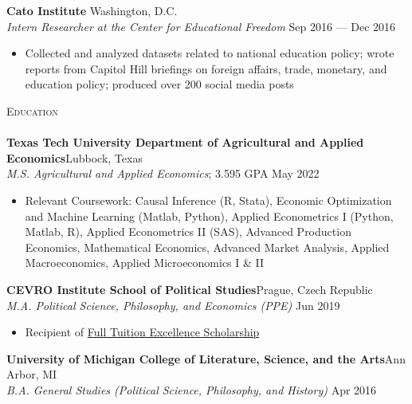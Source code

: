 \documentclass[a4paper,11pt]{article}
\newcommand{\lineunder} {
    \vspace*{-8pt} \\
    \hspace*{-18pt} \hrulefill \\
}
\newcommand{\header} [1] {
    {\hspace*{-18pt}\vspace*{6pt} \textsc{\large{#1}}}
    \vspace*{-6pt} \lineunder
}
\begin{document}
\textbf{Cato Institute} \hfill Washington, D.C.\\
\textit{Intern Researcher at the Center for Educational Freedom} \hfill Sep 2016 --- Dec 2016\\
\begin{itemize}
    \item Collected and analyzed datasets related to national education policy; wrote reports from Capitol Hill briefings on foreign affairs, trade, monetary, and education policy; produced over 200 social media posts 
\end{itemize}
\vspace{1mm}

\header{Education}
\textbf{Texas Tech University Department of Agricultural and Applied Economics}\hfill Lubbock, Texas\\
\textit{M.S. Agricultural and Applied Economics}; 3.595 GPA \hfill May 2022 \\
\begin{itemize}
    \item Relevant Coursework: Causal Inference (R, Stata), Economic Optimization and Machine Learning (Matlab, Python), Applied Econometrics I (Python, Matlab, R), Applied Econometrics II (SAS), Advanced Production Economics, Mathematical Economics, Advanced Market Analysis, Applied Macroeconomics, Applied Microeconomics I \& II
\end{itemize}

\textbf{CEVRO Institute School of Political Studies}\hfill Prague, Czech Republic\\
\textit{M.A. Political Science, Philosophy, and Economics (PPE)} \hfill Jun 2019\\
\begin{itemize}
    \item Recipient of \href{http://www.cevroinstitut.cz/en/article/scholarships/}{Full Tuition Excellence Scholarship}
\end{itemize}

\textbf{University of Michigan College of Literature, Science, and the Arts}\hfill Ann Arbor, MI\\
\textit{B.A. General Studies (Political Science, Philosophy, and History)} \hfill Apr 2016\\
\end{document}
